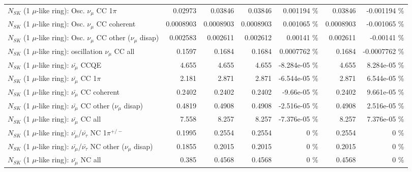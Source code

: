 \begin{table}
\begin{tabular}{| l | r | r | r  r | r  r |}
                          $N_{SK}$ (1 $\mu$-like ring): Osc. $\nu_\mu$ CC 1$\pi$ &         0.02973 &         0.03846 &         0.03846 & 0.001194 \%  &         0.03846 & -0.001194 \%  \\ 
                        $N_{SK}$ (1 $\mu$-like ring): Osc. $\nu_\mu$ CC coherent &       0.0008903 &       0.0008903 &       0.0008903 & 0.001065 \%  &       0.0008903 & -0.001065 \%  \\ 
         $N_{SK}$ (1 $\mu$-like ring): Osc. $\nu_\mu$ CC other ($\nu_\mu$ disap) &        0.002583 &        0.002611 &        0.002612 &  0.00141 \%  &        0.002611 & -0.00141 \%  \\ 
                      $N_{SK}$ (1 $\mu$-like ring): oscillation $\nu_\mu$ CC all &          0.1597 &          0.1684 &          0.1684 & 0.0007762 \%  &          0.1684 & -0.0007762 \%  \\ 
\hline
\hline
                              $N_{SK}$ (1 $\mu$-like ring): $\bar{\nu_\mu}$ CCQE &           4.655 &           4.655 &           4.655 & -8.284e-05 \%  &           4.655 & 8.284e-05 \%  \\ 
                         $N_{SK}$ (1 $\mu$-like ring): $\bar{\nu_\mu}$ CC 1$\pi$ &           2.181 &           2.871 &           2.871 & -6.544e-05 \%  &           2.871 & 6.544e-05 \%  \\ 
                       $N_{SK}$ (1 $\mu$-like ring): $\bar{\nu_\mu}$ CC coherent &          0.2402 &          0.2402 &          0.2402 & -9.66e-05 \%  &          0.2402 & 9.661e-05 \%  \\ 
        $N_{SK}$ (1 $\mu$-like ring): $\bar{\nu_\mu}$ CC other ($\nu_\mu$ disap) &          0.4819 &          0.4908 &          0.4908 & -2.516e-05 \%  &          0.4908 & 2.516e-05 \%  \\ 
                          $N_{SK}$ (1 $\mu$-like ring): $\bar{\nu_{\mu}}$ CC all &           7.558 &           8.257 &           8.257 & -7.376e-05 \%  &           8.257 & 7.376e-05 \%  \\ 
\hline
  $N_{SK}$ (1 $\mu$-like ring): $\bar{\nu_\mu}$/$\bar{\nu_\tau}$ NC 1$\pi^{+/-}$ &          0.1995 &          0.2554 &          0.2554 &        0 \%  &          0.2554 &        0 \%  \\ 
$N_{SK}$ (1 $\mu$-like ring): $\bar{\nu_\mu}$/$\bar{\nu_\tau}$ NC other ($\nu_\mu$ disap) &          0.1855 &          0.2015 &          0.2015 &        0 \%  &          0.2015 &        0 \%  \\ 
                          $N_{SK}$ (1 $\mu$-like ring): $\bar{\nu_{\mu}}$ NC all &           0.385 &          0.4568 &          0.4568 &        0 \%  &          0.4568 &        0 \%  \\ 

\end{tabular}
\end{table}

